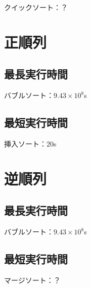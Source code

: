 \documentclass{jsarticle}
\begin{document}
クイックソート：？

\section{正順列}

\subsection{最長実行時間}

バブルソート：$9.43 \times 10^8$s

\subsection{最短実行時間}

挿入ソート：20s

\section{逆順列}

\subsection{最長実行時間}

バブルソート：$9.43 \times 10^8$s

\subsection{最短実行時間}

マージソート：？
\end{document}
